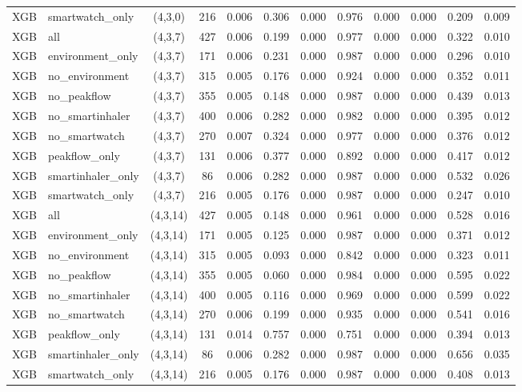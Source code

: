 \begin{longtable}{llcccccccccc}
XGB & smartwatch\_only & (4,3,0) & 216 & 0.006 & 0.306 & 0.000 & 0.976 & 0.000 & 0.000 & 0.209 & 0.009 \\
XGB & all & (4,3,7) & 427 & 0.006 & 0.199 & 0.000 & 0.977 & 0.000 & 0.000 & 0.322 & 0.010 \\
XGB & environment\_only & (4,3,7) & 171 & 0.006 & 0.231 & 0.000 & 0.987 & 0.000 & 0.000 & 0.296 & 0.010 \\
XGB & no\_environment & (4,3,7) & 315 & 0.005 & 0.176 & 0.000 & 0.924 & 0.000 & 0.000 & 0.352 & 0.011 \\
XGB & no\_peakflow & (4,3,7) & 355 & 0.005 & 0.148 & 0.000 & 0.987 & 0.000 & 0.000 & 0.439 & 0.013 \\
XGB & no\_smartinhaler & (4,3,7) & 400 & 0.006 & 0.282 & 0.000 & 0.982 & 0.000 & 0.000 & 0.395 & 0.012 \\
XGB & no\_smartwatch & (4,3,7) & 270 & 0.007 & 0.324 & 0.000 & 0.977 & 0.000 & 0.000 & 0.376 & 0.012 \\
XGB & peakflow\_only & (4,3,7) & 131 & 0.006 & 0.377 & 0.000 & 0.892 & 0.000 & 0.000 & 0.417 & 0.012 \\
XGB & smartinhaler\_only & (4,3,7) & 86 & 0.006 & 0.282 & 0.000 & 0.987 & 0.000 & 0.000 & 0.532 & 0.026 \\
XGB & smartwatch\_only & (4,3,7) & 216 & 0.005 & 0.176 & 0.000 & 0.987 & 0.000 & 0.000 & 0.247 & 0.010 \\
XGB & all & (4,3,14) & 427 & 0.005 & 0.148 & 0.000 & 0.961 & 0.000 & 0.000 & 0.528 & 0.016 \\
XGB & environment\_only & (4,3,14) & 171 & 0.005 & 0.125 & 0.000 & 0.987 & 0.000 & 0.000 & 0.371 & 0.012 \\
XGB & no\_environment & (4,3,14) & 315 & 0.005 & 0.093 & 0.000 & 0.842 & 0.000 & 0.000 & 0.323 & 0.011 \\
XGB & no\_peakflow & (4,3,14) & 355 & 0.005 & 0.060 & 0.000 & 0.984 & 0.000 & 0.000 & 0.595 & 0.022 \\
XGB & no\_smartinhaler & (4,3,14) & 400 & 0.005 & 0.116 & 0.000 & 0.969 & 0.000 & 0.000 & 0.599 & 0.022 \\
XGB & no\_smartwatch & (4,3,14) & 270 & 0.006 & 0.199 & 0.000 & 0.935 & 0.000 & 0.000 & 0.541 & 0.016 \\
XGB & peakflow\_only & (4,3,14) & 131 & 0.014 & 0.757 & 0.000 & 0.751 & 0.000 & 0.000 & 0.394 & 0.013 \\
XGB & smartinhaler\_only & (4,3,14) & 86 & 0.006 & 0.282 & 0.000 & 0.987 & 0.000 & 0.000 & 0.656 & 0.035 \\
XGB & smartwatch\_only & (4,3,14) & 216 & 0.005 & 0.176 & 0.000 & 0.987 & 0.000 & 0.000 & 0.408 & 0.013 \\

\end{longtable}
